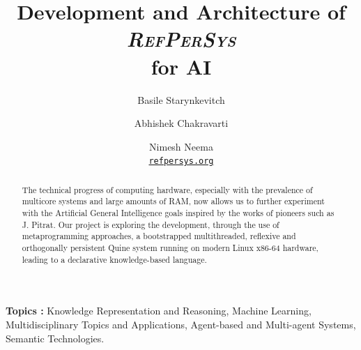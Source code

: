 \documentclass{ecai}
\newcommand{\RefPerSys}{{\textit{\textsc{RefPerSys}}}}
\begin{document}
\title{Development and Architecture of {\RefPerSys}\\ { for AI}}

\author{Basile Starynkevitch
\and Abhishek Chakravarti 
\and  Nimesh Neema\\
\href{http://refpersys.org/}{\texttt{refpersys.org}}}

\maketitle


\begin{abstract}
  

The technical progress of computing hardware, especially with the prevalence of
multicore systems and large amounts of RAM, now allows us to further experiment
with the Artificial General Intelligence goals inspired by the works of pioneers
such as J. Pitrat\cite{Pitrat:2009:ArtifBeings, Pitrat:1996:FGCS, Pitrat:2009:AST}.
Our project is exploring the development, through the use of metaprogramming approaches,
a bootstrapped multithreaded, reflexive and orthogonally persistent Quine system running
on modern Linux x86-64 hardware, leading to a declarative knowledge-based language.
\end{abstract}

\smallskip

\textbf{Topics :} Knowledge Representation and Reasoning, Machine
Learning, Multidisciplinary Topics and Applications, Agent-based and
Multi-agent Systems, Semantic Technologies.
\end{document}
